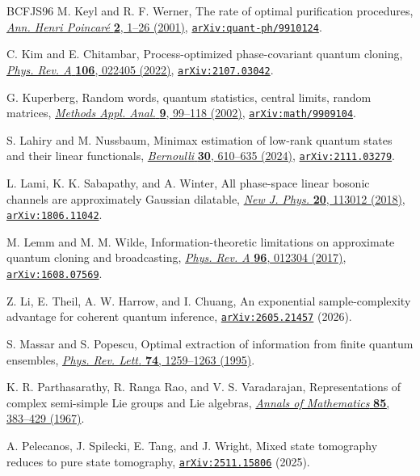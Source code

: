 \documentclass[11pt]{article}
\theoremstyle{remark}
\theoremstyle{plain}
\newcommand{\doi}[2]{\href{https://doi.org/#1}{#2}}
\newcommand{\arxiv}[1]{\href{https://arxiv.org/abs/#1}{\texttt{arXiv:#1}}}
\begin{document}
\begin{thebibliography}{BCFJS96}
M. Keyl and R. F. Werner,
The rate of optimal purification procedures,
\doi{10.1007/PL00001027}{\emph{Ann. Henri Poincar\'e} \textbf{2}, 1--26 (2001)},
\arxiv{quant-ph/9910124}.

C. Kim and E. Chitambar,
Process-optimized phase-covariant quantum cloning,
\doi{10.1103/PhysRevA.106.022405}{\emph{Phys. Rev. A} \textbf{106}, 022405 (2022)},
\arxiv{2107.03042}.

G. Kuperberg,
Random words, quantum statistics, central limits, random matrices,
\doi{10.4310/MAA.2002.v9.n1.a3}{\emph{Methods Appl. Anal.}
\textbf{9}, 99--118 (2002)},
\arxiv{math/9909104}.

S. Lahiry and M. Nussbaum,
Minimax estimation of low-rank quantum states and their linear functionals,
\doi{10.3150/23-BEJ1610}{\emph{Bernoulli} \textbf{30}, 610--635 (2024)},
\arxiv{2111.03279}.

L. Lami, K. K. Sabapathy, and A. Winter,
All phase-space linear bosonic channels are approximately Gaussian dilatable,
\doi{10.1088/1367-2630/aae738}{\emph{New J. Phys.} \textbf{20}, 113012 (2018)},
\arxiv{1806.11042}.

M. Lemm and M. M. Wilde,
Information-theoretic limitations on approximate quantum cloning and broadcasting,
\doi{10.1103/PhysRevA.96.012304}{\emph{Phys. Rev. A} \textbf{96}, 012304 (2017)},
\arxiv{1608.07569}.

Z. Li, E. Theil, A. W. Harrow, and I. Chuang,
An exponential sample-complexity advantage for coherent quantum inference,
\arxiv{2605.21457} (2026).

S. Massar and S. Popescu,
Optimal extraction of information from finite quantum ensembles,
\doi{10.1103/PhysRevLett.74.1259}{\emph{Phys. Rev. Lett.} \textbf{74}, 1259--1263 (1995)}.

K. R. Parthasarathy, R. Ranga Rao, and V. S. Varadarajan,
Representations of complex semi-simple Lie groups and Lie algebras,
\doi{10.2307/1970351}{\emph{Annals of Mathematics} \textbf{85}, 383--429 (1967)}.

A. Pelecanos, J. Spilecki, E. Tang, and J. Wright,
Mixed state tomography reduces to pure state tomography,
\arxiv{2511.15806} (2025).


\end{thebibliography}
\end{document}

